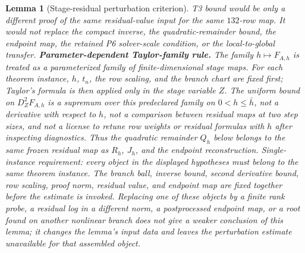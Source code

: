 \documentclass[preprint,12pt]{elsarticle}
\newtheorem{lemma}{Lemma}
\begin{document}
\begin{lemma}[Stage-residual perturbation criterion]
T3 bound would be only a different proof of the same residual-value input for
the same \(132\)-row map.  It would not replace the compact inverse, the
quadratic-remainder bound, the endpoint map, the retained P6 solver-scale
condition, or the local-to-global transfer.
\noindent\textbf{Parameter-dependent Taylor-family rule.}
The family \(h\mapsto F_{A,h}\) is treated as a parameterized family of
finite-dimensional stage maps.  For each theorem instance, \(h\), \(t_n\),
the row scaling, and the branch chart are fixed first; Taylor's formula is
then applied only in the stage variable \(Z\).  The uniform bound on
\(D_Z^2F_{A,h}\) is a supremum over this predeclared family on
\(0<h\le\bar h\), not a derivative with respect to \(h\), not a comparison
between residual maps at two step sizes, and not a license to retune row
weights or residual formulas with \(h\) after inspecting diagnostics.  Thus
the quadratic remainder \(Q_h\) below belongs to the same frozen residual map
as \(R_h\), \(J_h\), and the endpoint reconstruction.
Single-instance requirement: every object in the displayed hypotheses must
belong to the same theorem instance.  The branch ball, inverse bound, second
derivative bound, row scaling, proof norm, residual value, and endpoint map
are fixed together before the estimate is invoked.  Replacing one of these
objects by a finite rank probe, a residual log in a different norm, a
postprocessed endpoint map, or a root found on another nonlinear branch does
not give a weaker conclusion of this lemma; it changes the lemma's input data
and leaves the perturbation estimate unavailable for that assembled object.
\end{lemma}
\end{document}
